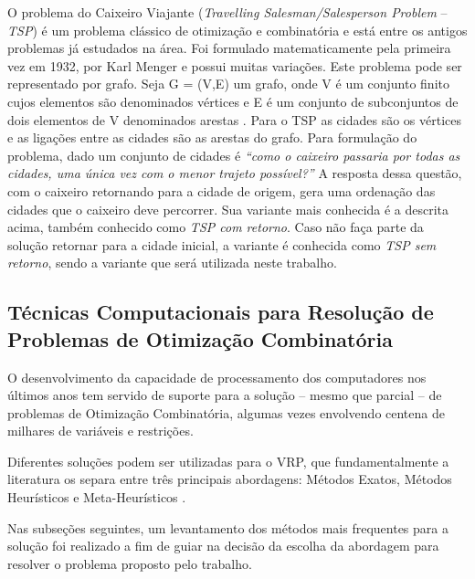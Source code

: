 O problema do Caixeiro Viajante (\emph{Travelling Salesman/Salesperson Problem} -- \emph{TSP}) é um problema clássico de otimização e combinatória e está entre os antigos problemas já estudados na área. Foi formulado matematicamente pela primeira vez em 1932, por Karl Menger \cite{oliveira2015extensoes} e possui muitas variações.
Este problema pode ser representado por grafo. Seja G = (V,E) um grafo, onde V é um conjunto finito cujos elementos são denominados vértices e E é um conjunto de subconjuntos de dois elementos de V denominados arestas \cite{nogueira2015introduccao}. Para o TSP as cidades são os vértices e as ligações entre as cidades são as arestas do grafo. Para formulação do problema, dado um conjunto de cidades é \emph{``como o caixeiro passaria por todas as cidades, uma única vez com o menor trajeto possível?''} A resposta dessa questão, com o caixeiro retornando para a cidade de origem, gera uma ordenação das cidades que o caixeiro deve percorrer. Sua variante mais conhecida é a descrita acima, também conhecido como \emph{TSP com retorno}. Caso não faça parte da solução retornar para a cidade inicial, a variante é conhecida como \emph{TSP sem retorno}, sendo a variante que será utilizada neste trabalho. 


\subsection{Técnicas Computacionais para Resolução de Problemas de Otimização Combinatória}
\label{tecnicas-computacionais}
O desenvolvimento da capacidade de processamento dos computadores nos últimos anos tem servido de suporte para a solução -- mesmo que parcial -- de problemas de Otimização Combinatória, algumas vezes envolvendo centena de milhares de variáveis e restrições.

Diferentes soluções podem ser utilizadas para o VRP, que fundamentalmente a literatura os separa entre três principais abordagens: Métodos Exatos, Métodos Heurísticos e Meta-Heurísticos \cite{maxwell}.  
Nas subseções seguintes, um levantamento dos métodos mais frequentes para a solução foi realizado a fim de guiar na decisão da escolha da abordagem para resolver o problema proposto pelo trabalho.

